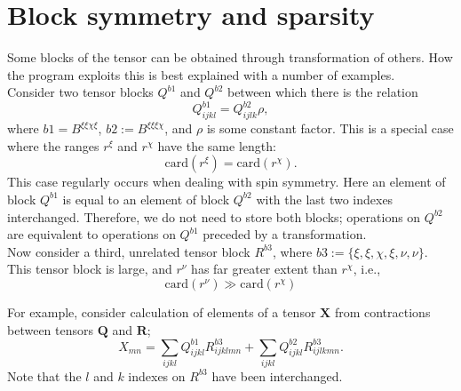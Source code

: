 \section {Block symmetry and sparsity }

\noindent Some blocks of the tensor can be obtained through transformation of others.
How the program exploits this is best explained with a number of examples.\\ 

\noindent Consider two tensor blocks $Q^{b1}$ and $Q^{b2}$ between which there is the relation
\begin{equation}
Q^{b1}_{ijkl} = Q^{b2}_{ijlk}\rho,
\label{eqn:Qsymm}
\end{equation}
where $b1 = B^{\xi\xi\chi\xi }$, $b2 := B^{\xi\xi\xi\chi }$, and $\rho$ is some
constant factor. This is a special case where the ranges $r^{\xi}$ and
$r^{\chi}$ have the same length:
\begin{equation}
\text{card}(r^{\xi}) = \text{card}(r^{\chi}).
\end{equation}
This case regularly occurs when dealing with spin symmetry. Here an element of block $Q^{b1}$ is equal to an element of block $Q^{b2}$ with the last two indexes interchanged.
Therefore, we do not need to store both blocks; operations on $Q^{b2}$ are equivalent to operations on $Q^{b1}$ preceded by a transformation.\\

\noindent Now consider a third, unrelated tensor block $R^{b3}$, where $b3 := \{\xi, \xi, \chi, \xi, \nu, \nu \}$. 
This tensor block is large, and $r^{\nu}$ has far greater extent than $r^{\chi}$, i.e.,
\begin{equation}
\text{card}(r^{\nu}) \gg \text{card}(r^{\chi})
\end{equation}

\noindent For example, consider calculation of elements of a tensor $\mathbf{X}$ from contractions between tensors $\mathbf{Q}$ and $\mathbf{R}$;
\begin{equation}
X_{mn} = \sum_{ijkl} Q^{b1}_{ijkl} R^{b3}_{ijklmn}+ \sum_{ijkl} Q^{b2}_{ijkl}R^{b3}_{ijlkmn}.
\label{eqn:Xexample}
\end{equation} 
Note that the $l$ and $k$ indexes on $R^{b3}$ have been interchanged. \\

